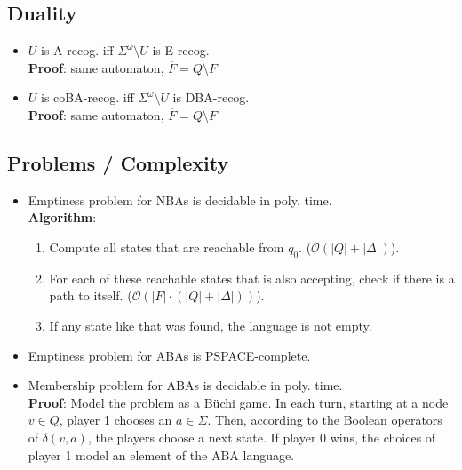 \documentclass{article}
\begin{document}
\subsection{Duality}
\begin{itemize}
	\item $U$ is A-recog. iff $\Sigma^\omega \setminus U$ is E-recog. \\
		\textbf{Proof}: same automaton, $\overline{F} = Q \setminus F$
	\item $U$ is coBA-recog. iff $\Sigma^\omega \setminus U$ is DBA-recog. \\
		\textbf{Proof}: same automaton, $\overline{F} = Q \setminus F$
\end{itemize}

\subsection{Problems / Complexity}
\begin{itemize}
	\item Emptiness problem for NBAs is decidable in poly. time. \\
    	\textbf{Algorithm}: 
    	\begin{enumerate}
    		\item Compute all states that are reachable from $q_0$. ($\mathcal{O}(|Q| + |\Delta|)$).
    		\item For each of these reachable states that is also accepting, check if there is a path to itself. ($\mathcal{O}(|F| \cdot (|Q| + |\Delta|))$).
    		\item If any state like that was found, the language is not empty.
    	\end{enumerate}
    \item Emptiness problem for ABAs is PSPACE-complete. 
    \item Membership problem for ABAs is decidable in poly. time. \\
    	\textbf{Proof}: Model the problem as a Büchi game. In each turn, starting at a node $v \in Q$, player 1 chooses an $a \in \Sigma$. Then, according to the Boolean operators of $\delta(v, a)$, the players choose a next state. If player 0 wins, the choices of player 1 model an element of the ABA language.
\end{itemize}


\newpage
\end{document}
